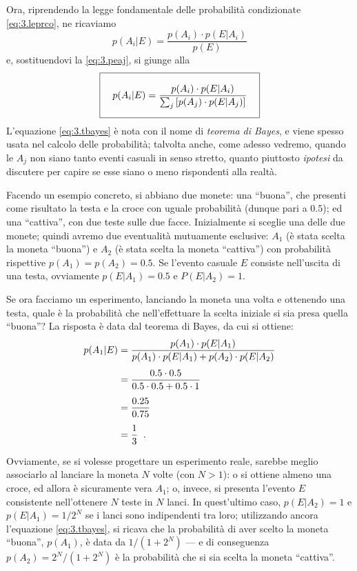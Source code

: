 Ora, riprendendo la legge fondamentale delle probabilit\`a
condizionate \eqref{eq:3.leprco}, ne ricaviamo
\begin{equation*}
  p(A_i | E) = \frac{p(A_i) \cdot p(E | A_i)} { p(E) }
\end{equation*}
e, sostituendovi la \eqref{eq:3.peaj}, si giunge alla
\begin{equation} \label{eq:3.tbayes}
  \boxed{ \rule[-6mm]{0mm}{14mm} \quad
    p(A_i | E) = \frac{p(A_i) \cdot p(E | A_i)}
    {\sum_j \left[ p(A_j) \cdot p(E | A_j) \right]}
    \quad }
\end{equation}
L'equazione \eqref{eq:3.tbayes} \`e nota con il nome di
\emph{teorema di Bayes}, e viene spesso usata nel calcolo
delle probabilit\`a; talvolta anche, come adesso vedremo,
quando le $A_j$ non siano tanto eventi casuali in senso
stretto, quanto piuttosto \emph{ipotesi} da discutere per
capire se esse siano o meno rispondenti alla realt\`a.

Facendo un esempio concreto, si abbiano due monete: una
``buona'', che presenti come risultato la testa e la croce
con uguale probabilit\`a (dunque pari a $0.5$); ed una
``cattiva'', con due teste sulle due facce.  Inizialmente si
sceglie una delle due monete; quindi avremo due
eventualit\`a mutuamente esclusive: $A_1$ (\`e stata scelta
la moneta ``buona'') e $A_2$ (\`e stata scelta la moneta
``cattiva'') con probabilit\`a rispettive $p(A_1) = p(A_2) =
0.5$.  Se l'evento casuale $E$ consiste nell'uscita di una
testa, ovviamente $p(E|A_1) = 0.5$ e $P(E|A_2) = 1$.

Se ora facciamo un esperimento, lanciando la moneta una
volta e ottenendo una testa, quale \`e la probabilit\`a che
nell'effettuare la scelta iniziale si sia presa quella
``buona''?  La risposta \`e data dal teorema di Bayes, da
cui si ottiene:
\begin{align*}
  p(A_1|E) &= \frac{p(A_1) \cdot p(E|A_1)}{p(A_1)
    \cdot p(E|A_1) + p(A_2) \cdot p(E|A_2)} \\[1ex]
  &= \frac{0.5 \cdot 0.5}{0.5 \cdot 0.5 + 0.5 \cdot
    1} \\[1ex]
  &= \frac{0.25}{0.75} \\[1ex]
  &= \frac{1}{3} \;\; .
\end{align*}

Ovviamente, se si volesse progettare un esperimento reale,
sarebbe meglio associarlo al lanciare la moneta $N$ volte
(con $N > 1$): o si ottiene almeno una croce, ed allora \`e
sicuramente vera $A_1$; o, invece, si presenta l'evento $E$
consistente nell'ottenere $N$ teste in $N$ lanci.  In
quest'ultimo caso, $p(E|A_2) = 1$ e $p(E|A_1) = 1/2^N$ se i
lanci sono indipendenti tra loro; utilizzando ancora
l'equazione \eqref{eq:3.tbayes}, si ricava che la
probabilit\`a di aver scelto la moneta ``buona'', $p(A_1)$,
\`e data da $1/(1+2^N)$ --- e di conseguenza $p(A_2) =
2^N/(1+2^N)$ \`e la probabilit\`a che si sia scelta la
moneta ``cattiva''.

